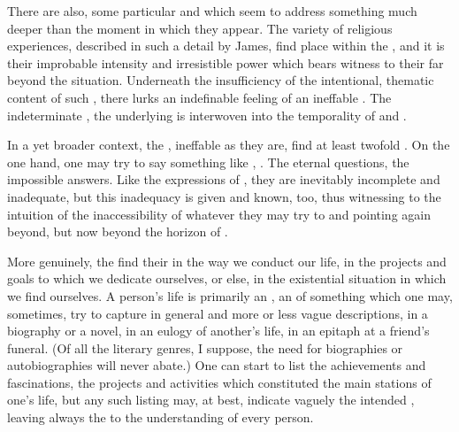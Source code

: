 {There are also, some particular  and  which
seem to address something much deeper than the  moment in
which they appear.
%
The variety of religious experiences, described in such a detail by 
James, find place within the \hoa, and it is their improbable 
intensity and irresistible power which bears witness to their 
 far beyond the  situation. 
Underneath the insufficiency of the
intentional, thematic content of such , there lurks an
indefinable feeling of an ineffable .  The indeterminate
, the underlying  is interwoven into the
temporality of  and .

\pa\label{pa:manifest2} \mine 
In a yet broader context, the ,
ineffable as they are, find at least twofold .
On the one hand, one may try to say something like , . The eternal questions, the 
impossible answers. Like the expressions of , they are inevitably incomplete and inadequate, but this 
inadequacy is given and known, too, thus witnessing to the intuition of 
the inaccessibility of whatever they may try to  and 
pointing again beyond, but now beyond the horizon of .

More genuinely, the  find their  in the
way we conduct our life, in the projects and goals to which we
dedicate ourselves, or else, in the existential situation in which we find 
ourselves.  A person's life
is primarily an , an  of something which
one may, sometimes, try to capture in general and more or less vague
descriptions, in a biography or a novel, in an eulogy of another's
life, in an epitaph at a friend's funeral. 
(Of all the literary genres, I suppose, the need for biographies or 
autobiographies will never abate.) 
One can start to list the
achievements and fascinations, the projects and activities which
constituted the main stations of one's life, but any such listing may,
at best, indicate vaguely the intended , leaving always
the  to the understanding of every person.

}

